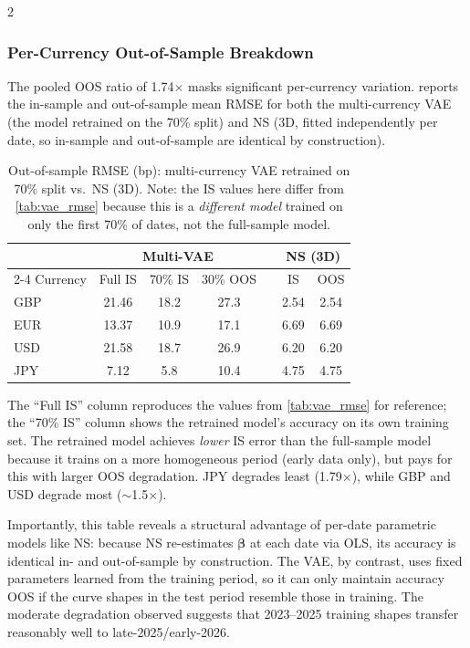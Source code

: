 \documentclass[10pt,a4paper]{article}
\theoremstyle{plain}
\theoremstyle{definition}
\begin{document}
\begin{multicols}{2}
\subsubsection{Per-Currency Out-of-Sample Breakdown}

The pooled OOS ratio of 1.74$\times$ masks significant per-currency variation.  reports the in-sample and out-of-sample mean RMSE for both the multi-currency VAE (the model retrained on the 70\% split) and NS (3D, fitted independently per date, so in-sample and out-of-sample are identical by construction).

\begin{table}[H]
\centering
\caption{Out-of-sample RMSE (bp): multi-currency VAE retrained on 70\% split vs.\ NS (3D). Note: the IS values here differ from \cref{tab:vae_rmse} because this is a \textit{different model} trained on only the first 70\% of dates, not the full-sample model.}\label{tab:oos_by_ccy}
\begin{tabular}{lcccccc}
\toprule
 & \multicolumn{3}{c}{Multi-VAE} & & \multicolumn{2}{c}{NS (3D)} \\
\cmidrule{2-4} \cmidrule{6-7}
Currency & Full IS & 70\% IS & 30\% OOS & & IS & OOS \\
\midrule
GBP & 21.46 & 18.2 & 27.3 & & 2.54 & 2.54 \\
EUR & 13.37 & 10.9 & 17.1 & & 6.69 & 6.69 \\
USD & 21.58 & 18.7 & 26.9 & & 6.20 & 6.20 \\
JPY & 7.12 & 5.8 & 10.4 & & 4.75 & 4.75 \\
\bottomrule
\end{tabular}
\end{table}

\noindent The ``Full IS'' column reproduces the values from \cref{tab:vae_rmse} for reference; the ``70\% IS'' column shows the retrained model's accuracy on its own training set. The retrained model achieves \textit{lower} IS error than the full-sample model because it trains on a more homogeneous period (early data only), but pays for this with larger OOS degradation. JPY degrades least (1.79$\times$), while GBP and USD degrade most ($\sim$1.5$\times$).

Importantly, this table reveals a structural advantage of per-date parametric models like NS: because NS re-estimates $\boldsymbol{\beta}$ at each date via OLS, its accuracy is identical in- and out-of-sample by construction. The VAE, by contrast, uses fixed parameters learned from the training period, so it can only maintain accuracy OOS if the curve shapes in the test period resemble those in training. The moderate degradation observed suggests that 2023--2025 training shapes transfer reasonably well to late-2025/early-2026.


\end{multicols}
\end{document}
